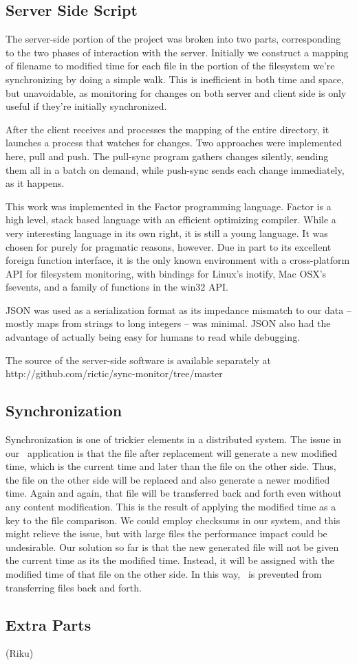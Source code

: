 \subsection{Server Side Script}
The server-side portion of the project was broken into two parts, corresponding to the two phases of interaction with the server. Initially we construct a mapping of filename to modified time for each file in the portion of the filesystem we're synchronizing by doing a simple walk. This is inefficient in both time and space, but unavoidable, as monitoring for changes on both server and client side is only useful if they're initially synchronized.

After the client receives and processes the mapping of the entire directory, it launches a process that watches for changes. Two approaches were implemented here, pull and push. The pull-sync program gathers changes silently, sending them all in a batch on demand, while push-sync sends each change immediately, as it happens.

This work was implemented in the Factor programming language.  Factor is a high level, stack based language with an efficient optimizing compiler.  While a very interesting language in its own right, it is still a young language.  It was chosen for \teledroid purely for pragmatic reasons, however.  Due in part to its excellent foreign function interface, it is the only known environment with a cross-platform API for filesystem monitoring, with bindings for Linux's inotify, Mac OSX's fsevents, and a family of functions in the win32 API.

JSON was used as a serialization format as its impedance mismatch to our data – mostly maps from strings to long integers – was minimal.  JSON also had the advantage of actually being easy for humans to read while debugging.

The source of the server-side software is available separately at http://github.com/rictic/sync-monitor/tree/master

\subsection{Synchronization}
Synchronization is one of trickier elements in a distributed system. The issue in our \teledroid\ application is that the file after replacement will generate a new modified time, which is the current time and later than the file on the other side. Thus, the file on the other side will be replaced and also generate a newer modified time. Again and again, that file will be transferred back and forth even without any content modification. This is the result of applying the modified time as a key to the file comparison. We could employ checksums in our system, and this might relieve the issue, but with large files the performance impact could be undesirable. Our solution so far is that the new generated file will not be given the current time as its the modified time. Instead, it will be assigned with the modified time of that file on the other side. In this way, \teledroid\ is prevented from transferring files back and forth.

\subsection{Extra Parts}
(Riku)
